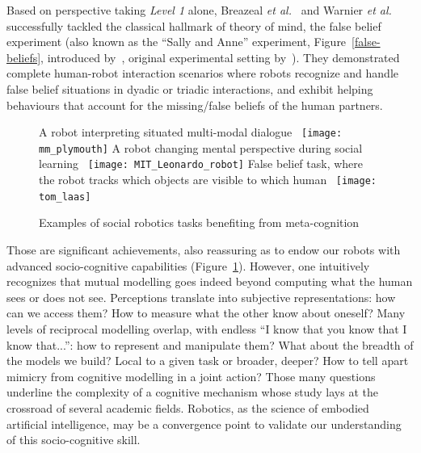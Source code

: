 \documentclass{sig-alternate}
\newcommand{\etal}{{\textit{et al.~}}}
\begin{document}
Based on perspective taking \emph{Level 1} alone, Breazeal
\etal\cite{breazeal2009embodied} and Warnier \etal\cite{warnier2012when}
successfully tackled the classical hallmark of theory of mind, the false belief
experiment (also known as the ``Sally and Anne'' experiment,
Figure~\ref{false-beliefs}, introduced by~\cite{wimmer1983beliefs}, original
experimental setting by~\cite{baron1985does}). They demonstrated complete
human-robot interaction scenarios where robots recognize and handle false belief
situations in dyadic or triadic interactions, and exhibit helping behaviours
that account for the missing/false beliefs of the human partners.

\begin{figure}[htb]
\centering
\subcaptionbox
    {\small A robot interpreting situated multi-modal dialogue~\cite{belpaeme2012multimodal}}
    {\texttt{[image: mm\_plymouth]}}
\hspace{0.5cm}
\subcaptionbox
    {\small A robot changing mental perspective during social learning~\cite{breazeal2009embodied}}
    {\texttt{[image: MIT\_Leonardo\_robot]}}
\hspace{0.5cm}
\subcaptionbox
    {\small False belief task, where the robot tracks which objects are visible
    to which human~\cite{warnier2012when}}
    {\texttt{[image: tom\_laas]}}
\caption{\small Examples of social robotics tasks benefiting from meta-cognition}

\label{fig:mm_robotics}
\end{figure}

Those are significant achievements, also reassuring as to endow our robots with
advanced socio-cognitive capabilities (Figure~\ref{fig:mm_robotics}).  However,
one intuitively recognizes that mutual modelling goes indeed beyond computing
what the human sees or does not see. Perceptions translate into subjective
representations: how can we access them? How to measure what the other know
about oneself? Many levels of reciprocal modelling overlap, with endless ``I
know that you know that I know that...'': how to represent and manipulate them?
What about the breadth of the models we build?  Local to a given task or
broader, deeper? How to tell apart mimicry from cognitive modelling in a joint
action?  Those many questions underline the complexity of a cognitive mechanism
whose study lays at the crossroad of several academic fields. Robotics, as the
science of embodied artificial intelligence, may be a convergence point to
validate our understanding of this socio-cognitive skill.
\end{document}
